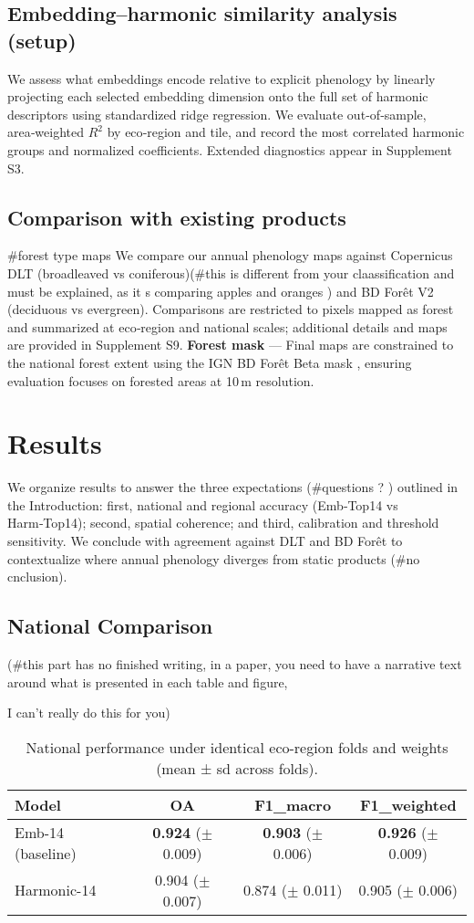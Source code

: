 \documentclass[utf8]{FrontiersinHarvard}
\begin{document}
\subsection{Embedding–harmonic similarity analysis (setup)}
We assess what embeddings encode relative to explicit phenology by linearly projecting each selected embedding dimension onto the full set of harmonic descriptors using standardized ridge regression. We evaluate out‑of‑sample, area‑weighted \(R^2\) by eco‑region and tile, and record the most correlated harmonic groups and normalized coefficients. Extended diagnostics appear in Supplement S3.

\subsection{Comparison with existing products} #forest type maps
We compare our annual phenology maps against Copernicus DLT (broadleaved vs coniferous)(#this is different from your claassification and must be explained, as it s comparing apples and oranges ) and BD Forêt V2 (deciduous vs evergreen). Comparisons are restricted to pixels mapped as forest and summarized at eco‑region and national scales; additional details and maps are provided in Supplement S9.
\textbf{Forest mask} — Final maps are constrained to the national forest extent using the IGN BD Forêt Beta mask \citep{IGN2024mask}, ensuring evaluation focuses on forested areas at 10\,m resolution.

\section{Results}
We organize results to answer the three expectations (#questions ? ) outlined in the Introduction: first, national and regional accuracy (Emb‑Top14 vs Harm‑Top14); second, spatial coherence; and third, calibration and threshold sensitivity. We conclude with agreement against DLT and BD Forêt to contextualize where annual phenology diverges from static products (#no cnclusion).
\subsection{National Comparison}
(#this part has no finished writing, in a paper, you need to have a narrative text around what is presented in each table and figure, 

I can’t really do this for you)
\begin{table}[H]
    \centering
    \begin{tabular}{lccc}
        \hline
        \textbf{Model} & \textbf{OA} & \textbf{F1\_macro} & \textbf{F1\_weighted} \\ \hline
        Emb-14 (baseline) & \textbf{0.924} (\(\pm\) 0.009) & \textbf{0.903} (\(\pm\) 0.006) & \textbf{0.926} (\(\pm\) 0.009) \\
        Harmonic-14 & 0.904 (\(\pm\) 0.007) & 0.874 (\(\pm\) 0.011) & 0.905 (\(\pm\) 0.006) \\
        \hline
    \end{tabular}
    \caption{National performance under identical eco-region folds and weights (mean ± sd across folds).}
    \label{tab:national_comparison}
\end{table}
\end{document}

